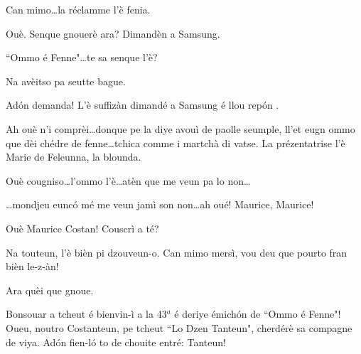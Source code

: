 \begin{drama}
\Vioujspeaks{} Can mimo\ldots la réclamme l'è fenia.

\Vioupspeaks Ouè. Senque gnouerè ara? Dimandèn a Samsung.


\Vioupspeaks ``Ommo é Fenne"\ldots te sa senque l'è?

\Vioujspeaks{} Na avèitso pa seutte bague.

\Vioupspeaks Ad\'on demanda! L'è suffizàn dimandé a Samsung é llou rep\'on .


\Vioupspeaks Ah ouè n'i comprèi\ldots donque pe la diye avouì de paolle seumple, ll'et eugn ommo que dèi chédre de fenne\ldots tchica comme i martchà di vatse. La prézentatrise l'è Marie de Feleunna, la blounda.

\Vioujspeaks Ouè cougniso\ldots l'ommo l'è\ldots atèn que me veun pa lo non\ldots

\Vioupspeaks \ldots mondjeu eunc\'o mé me veun jamì son non\ldots ah oué! Maurice, Maurice!

\Vioujspeaks Ouè Maurice Costan! Couscrì a té?

\Vioupspeaks Na touteun, l'è bièn pi dzouveun-o. Can mimo mersì, vou deu que pourto fran bièn le-z-àn!

\Vioujspeaks Ara quèi que gnoue.








\Mariespeaks Bonsouar a tcheut é bienvin-ì a la 43$^a$ é deriye émich\'on de ``Ommo é Fenne"! Oueu, noutro Costanteun, pe tcheut ``Lo Dzen Tanteun", cherdérè sa compagne de viya. Ad\'on fien-l\'o to de chouite entré: Tanteun!


\end{drama}
